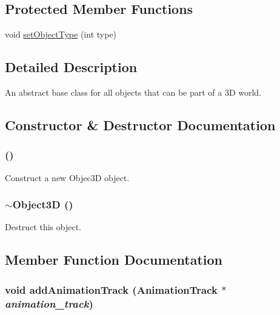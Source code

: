 \subsection*{Protected Member Functions}
\begin{CompactItemize}
\item 
void \hyperlink{classm3g_1_1Object3D_777701a101d1332abffa2ad6a255b91d}{setObjectType} (int type)
\end{CompactItemize}


\subsection{Detailed Description}
An abstract base class for all objects that can be part of a 3D world. 

\subsection{Constructor \& Destructor Documentation}
\hypertarget{classm3g_1_1Object3D_f4b10c33b9014a3f0a675ef4b699b773}{
\subsubsection[{Object3D}]{ ()}}
\label{classm3g_1_1Object3D_f4b10c33b9014a3f0a675ef4b699b773}


Construct a new Objec3D object. \hypertarget{classm3g_1_1Object3D_8ece10725587e63a2c75283c16cc4df5}{
\subsubsection[{$\sim$Object3D}]{\setlength{\rightskip}{0pt plus 5cm}$\sim${\bf Object3D} ()}}
\label{classm3g_1_1Object3D_8ece10725587e63a2c75283c16cc4df5}


Destruct this object. 

\subsection{Member Function Documentation}
\hypertarget{classm3g_1_1Object3D_415c0b110f95410ded9b85e5d99a496b}{
\subsubsection[{addAnimationTrack}]{\setlength{\rightskip}{0pt plus 5cm}void addAnimationTrack ({\bf AnimationTrack} $\ast$ {\em animation\_\-track})}}
\label{classm3g_1_1Object3D_415c0b110f95410ded9b85e5d99a496b}


